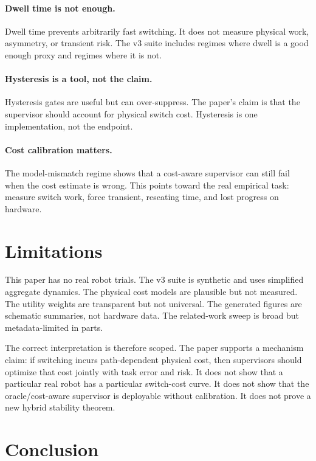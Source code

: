 \documentclass{article}
\begin{document}
\paragraph{Dwell time is not enough.}
Dwell time prevents arbitrarily fast switching.
It does not measure physical work, asymmetry, or transient risk.
The v3 suite includes regimes where dwell is a good enough proxy and regimes where it is not.

\paragraph{Hysteresis is a tool, not the claim.}
Hysteresis gates are useful but can over-suppress.
The paper's claim is that the supervisor should account for physical switch cost.
Hysteresis is one implementation, not the endpoint.

\paragraph{Cost calibration matters.}
The model-mismatch regime shows that a cost-aware supervisor can still fail when the cost estimate is wrong.
This points toward the real empirical task: measure switch work, force transient, reseating time, and lost progress on hardware.

\section{Limitations}

This paper has no real robot trials.
The v3 suite is synthetic and uses simplified aggregate dynamics.
The physical cost models are plausible but not measured.
The utility weights are transparent but not universal.
The generated figures are schematic summaries, not hardware data.
The related-work sweep is broad but metadata-limited in parts.

The correct interpretation is therefore scoped.
The paper supports a mechanism claim: if switching incurs path-dependent physical cost, then supervisors should optimize that cost jointly with task error and risk.
It does not show that a particular real robot has a particular switch-cost curve.
It does not show that the oracle/cost-aware supervisor is deployable without calibration.
It does not prove a new hybrid stability theorem.

\section{Conclusion}
\end{document}
